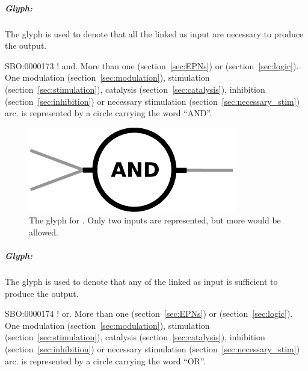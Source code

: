\subparagraph{Glyph: }\label{sec:and}

The glyph  is used to denote that all the  linked as input are necessary to produce the output.  

\begin{glyphDescription}
 \glyphSboTerm SBO:0000173 ! and.
 \glyphOrigin More than one  (section~\ref{sec:EPNs}) or  (section~\ref{sec:logic}).
 \glyphTarget  One modulation (section~\ref{sec:modulation}), stimulation (section~\ref{sec:stimulation}), catalysis (section~\ref{sec:catalysis}), inhibition (section~\ref{sec:inhibition}) or necessary stimulation (section~\ref{sec:necessary_stim}) arc.
 \glyphNode {} is represented by a circle carrying the word ``AND''.
\end{glyphDescription}

\begin{figure}[H]
  \centering
  \includegraphics[scale = 0.5]{images/and}
  \caption{The \PD glyph for . Only two inputs are represented, but more would be allowed.}
  \label{fig:and}
\end{figure}


\subparagraph{Glyph: }\label{sec:or}

The glyph  is used to denote that any of the  linked as input is sufficient to produce the output.  

\begin{glyphDescription}
 \glyphSboTerm SBO:0000174 ! or.
 \glyphOrigin More than one  (section~\ref{sec:EPNs}) or  (section~\ref{sec:logic}).
 \glyphTarget  One modulation (section~\ref{sec:modulation}), stimulation (section~\ref{sec:stimulation}), catalysis (section~\ref{sec:catalysis}), inhibition (section~\ref{sec:inhibition}) or necessary stimulation (section~\ref{sec:necessary_stim}) arc.
 \glyphNode {} is represented by a circle carrying the word ``OR''.
 \end{glyphDescription}

